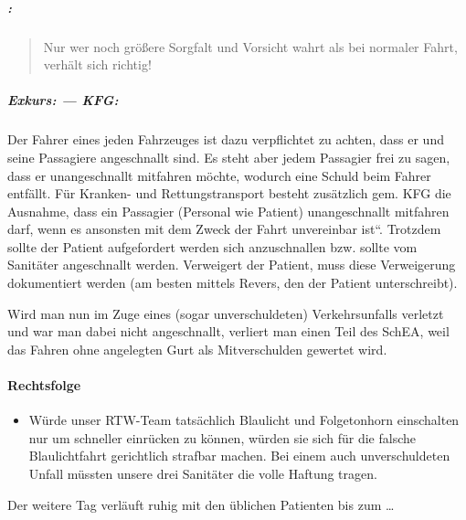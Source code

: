 \subparagraph*{:}
\begin{quotation}
Nur wer noch gr\"o{\ss}ere Sorgfalt und Vorsicht wahrt als bei normaler Fahrt, verhält sich richtig! 
\end{quotation}

\subparagraph*{Exkurs:  ---  KFG:}

Der Fahrer eines jeden Fahrzeuges ist dazu verpflichtet zu achten, dass
er und seine Passagiere angeschnallt sind. Es steht aber jedem
Passagier frei zu sagen, dass er unangeschnallt mitfahren m\"ochte,
wodurch eine Schuld beim Fahrer entfällt. F\"ur Kranken- und
Rettungstransport besteht zusätzlich gem.  KFG die Ausnahme, dass ein Passagier (Personal wie
Patient) unangeschnallt mitfahren darf, wenn es ansonsten
{\quotedblbase}mit dem Zweck der Fahrt unvereinbar
ist{\textquotedblleft}. Trotzdem sollte der Patient aufgefordert werden
sich anzuschnallen bzw. sollte vom Sanitäter angeschnallt werden.
Verweigert der Patient, muss diese Verweigerung dokumentiert werden (am
besten mittels Revers, den der Patient unterschreibt).

Wird man nun im Zuge eines (sogar unverschuldeten) Verkehrsunfalls
verletzt und war man dabei nicht angeschnallt, verliert man einen Teil
des SchEA, weil das Fahren ohne angelegten Gurt als Mitverschulden
gewertet wird.

\paragraph*{Rechtsfolge}

\begin{itemize}
	\item {\mdseries\color[rgb]{0.0,0.0,0.5019608}
	W\"urde unser RTW-Team tatsächlich Blaulicht und Folgetonhorn
	einschalten nur um schneller einr\"ucken zu k\"onnen, w\"urden sie sich
	f\"ur die falsche Blaulichtfahrt gerichtlich strafbar machen. Bei einem
	auch  unverschuldeten Unfall m\"ussten unsere drei Sanitäter die
	volle Haftung tragen.}

\end{itemize}

\vspace{1em}
Der weitere Tag verläuft ruhig mit den \"ublichen Patienten
bis zum \ldots

\vspace{1em}
{\centering
{}
\par}


